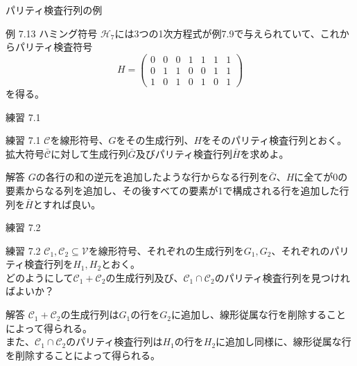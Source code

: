 \documentclass[dvipdfmx,10pt,jsarticle]{beamer}
\begin{document}
  \begin{frame}{パリティ検査行列の例}
    \begin{block}{例 7.13 ハミング符号}
      $\mathcal{H}_7$には3つの1次方程式が例7.9で与えられていて、これからパリティ検査符号
      \[H= \begin{pmatrix}
          0 & 0 & 0 & 1 & 1 & 1 & 1 \\
          0 & 1 & 1 & 0 & 0 & 1 & 1 \\
          1 & 0 & 1 & 0 & 1 & 0 & 1 
        \end{pmatrix} \]
      を得る。
    \end{block}
  \end{frame}
  \begin{frame}{練習 7.1}
    \begin{block}{練習 7.1}
      $\mathcal{C}$を線形符号、$G$をその生成行列、$H$をそのパリティ検査行列とおく。拡大符号$\bar{\mathcal{C}}$に対して生成行列$\bar G$及びパリティ検査行列$\bar H$を求めよ。
    \end{block}
    \begin{block}{解答}
      $G$の各行の和の逆元を追加したような行からなる行列を$\bar G$、$H$に全てが$0$の要素からなる列を追加し、その後すべての要素が1で構成される行を追加した行列を$\bar H$とすれば良い。
    \end{block}
  \end{frame}
  \begin{frame}{練習 7.2}
    \begin{block}{練習 7.2}
      $\mathcal{C}_1, \mathcal{C}_2 \subseteq \mathcal{V}$を線形符号、それぞれの生成行列を$G_1, G_2$、それぞれのパリティ検査行列を$H_1, H_2$とおく。\\
      どのようにして$\mathcal{C}_1 + \mathcal{C}_2$の生成行列及び、$\mathcal{C}_1 \cap \mathcal{C}_2$のパリティ検査行列を見つければよいか？
    \end{block}
    \begin{block}{解答}
      $\mathcal{C}_1 + \mathcal{C}_2$の生成行列は$G_1$の行を$G_2$に追加し、線形従属な行を削除することによって得られる。\\
      また、$\mathcal{C}_1 \cap \mathcal{C}_2$のパリティ検査行列は$H_1$の行を$H_2$に追加し同様に、線形従属な行を削除することによって得られる。
    \end{block}
  \end{frame}
\end{document}
